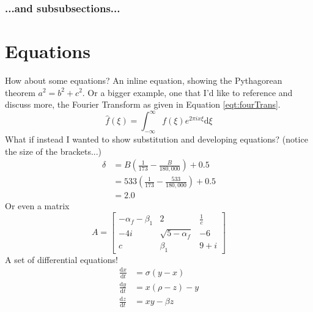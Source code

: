 \documentclass[hidelinks, 12pt]{article}%
\begin{document}
            \subsubsection{...and subsubsections...}

    \section{Equations}
        How about some equations? An inline equation, showing the Pythagorean theorem \(a^{2} = b^{2} + c^{2}\).
        Or a bigger example, one that I'd like to reference and discuss more, the Fourier Transform as given in Equation \ref{eqt:fourTrans}.
        \begin{equation}
            \hat{f}\left(\xi\right) = \int_{-\infty}^{\infty}f\left(\xi\right)e^{2\pi ix\xi}\text{d}\xi
            \label{eqt:fourTrans}
        \end{equation}
        What if instead I wanted to show substitution and developing equations? (notice the size of the brackets...)
        \begin{align}
            \delta & = B\left(\frac{1}{173} - \frac{B}{180,000}\right) + 0.5\nonumber      \\
                   & = 533\left(\frac{1}{173} - \frac{533}{180,000}\right) + 0.5 \nonumber \\
                   & = 2.0 \nonumber
        \end{align}
        Or even a matrix
        \begin{equation*}
            A =
            \begin{bmatrix}
                -\alpha_f-\beta_1 & 2                 & \frac{1}{c} \\
                -4i               & \sqrt{5-\alpha_f} & -6          \\
                c                 & \beta_1           & 9 + i
            \end{bmatrix}
        \end{equation*}
        A set of differential equations!
        \begin{align}
            \frac{\text{d}x}{\text{d}t} &= \sigma (y-x)\\
            \frac{\text{d}y}{\text{d}t} &= x(\rho -z)-y\\
            \frac{\text{d}z}{\text{d}t} &= xy-\beta z
        \end{align}


    \clearpage
\end{document}
